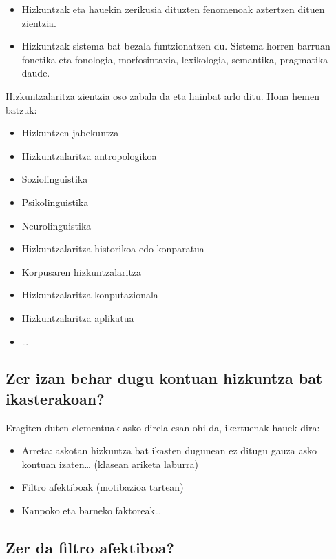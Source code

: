 \documentclass[
]{book}
\providecommand{\tightlist}{%
  \setlength{\itemsep}{0pt}\setlength{\parskip}{0pt}}
\begin{document}
\begin{itemize}
\tightlist
\item
  Hizkuntzak eta hauekin zerikusia dituzten fenomenoak aztertzen
  dituen zientzia.
\item
  Hizkuntzak sistema bat bezala funtzionatzen du. Sistema horren
  barruan fonetika eta fonologia, morfosintaxia, lexikologia,
  semantika, pragmatika daude.
\end{itemize}

Hizkuntzalaritza zientzia oso zabala da eta hainbat arlo ditu.
Hona hemen batzuk:

\begin{itemize}
\tightlist
\item
  Hizkuntzen jabekuntza
\item
  Hizkuntzalaritza antropologikoa
\item
  Soziolinguistika
\item
  Psikolinguistika
\item
  Neurolinguistika
\item
  Hizkuntzalaritza historikoa edo konparatua
\item
  Korpusaren hizkuntzalaritza
\item
  Hizkuntzalaritza konputazionala
\item
  Hizkuntzalaritza aplikatua
\item
  \ldots{}
\end{itemize}

\hypertarget{zer-izan-behar-dugu-kontuan-hizkuntza-bat-ikasterakoan}{%
\subsection{Zer izan behar dugu kontuan hizkuntza bat ikasterakoan?}\label{zer-izan-behar-dugu-kontuan-hizkuntza-bat-ikasterakoan}}

Eragiten duten elementuak asko direla esan ohi da, ikertuenak hauek dira:

\begin{itemize}
\tightlist
\item
  Arreta: askotan hizkuntza bat ikasten dugunean ez ditugu gauza
  asko kontuan izaten\ldots{} (klasean ariketa laburra)
\item
  Filtro afektiboak (motibazioa tartean)
\item
  Kanpoko eta barneko faktoreak\ldots{}
\end{itemize}

\hypertarget{zer-da-filtro-afektiboa}{%
\subsection{Zer da filtro afektiboa?}\label{zer-da-filtro-afektiboa}}
\end{document}
